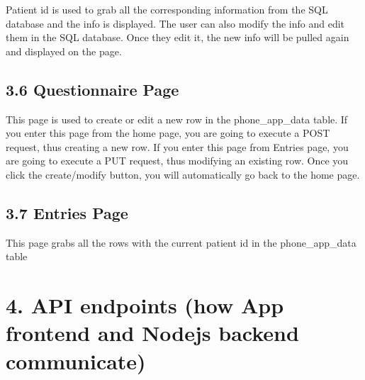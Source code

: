 \documentclass[]{book}
\begin{document}
Patient id is used to grab all the corresponding information from the
SQL database and the info is displayed. The user can also modify the
info and edit them in the SQL database. Once they edit it, the new info
will be pulled again and displayed on the page.

\subsection{3.6 Questionnaire Page}\label{questionnaire-page}

This page is used to create or edit a new row in the phone\_app\_data
table. If you enter this page from the home page, you are going to
execute a POST request, thus creating a new row. If you enter this page
from Entries page, you are going to execute a PUT request, thus
modifying an existing row. Once you click the create/modify button, you
will automatically go back to the home page.

\subsection{3.7 Entries Page}\label{entries-page}

This page grabs all the rows with the current patient id in the
phone\_app\_data table

\section{4. API endpoints (how App frontend and Nodejs backend
communicate)}\label{api-endpoints-how-app-frontend-and-nodejs-backend-communicate}
\end{document}
